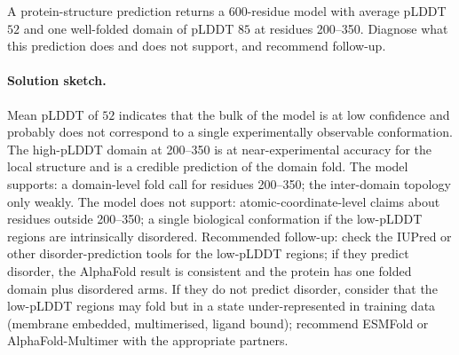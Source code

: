 \begin{exercise}
A protein-structure prediction returns a 600-residue model with
average pLDDT $52$ and one well-folded domain of pLDDT $85$ at
residues 200--350. Diagnose what this prediction does and does not
support, and recommend follow-up.

\paragraph{Solution sketch.}
Mean pLDDT of $52$ indicates that the bulk of the model is at low
confidence and probably does not correspond to a single experimentally
observable conformation. The high-pLDDT domain at 200--350 is at
near-experimental accuracy for the local structure and is a credible
prediction of the domain fold. The model supports: a domain-level
fold call for residues 200--350; the inter-domain topology only
weakly. The model does not support: atomic-coordinate-level claims
about residues outside 200--350; a single biological conformation if
the low-pLDDT regions are intrinsically disordered. Recommended
follow-up: check the IUPred or other disorder-prediction tools for
the low-pLDDT regions; if they predict disorder, the AlphaFold result
is consistent and the protein has one folded domain plus disordered
arms. If they do not predict disorder, consider that the low-pLDDT
regions may fold but in a state under-represented in training data
(membrane embedded, multimerised, ligand bound); recommend
ESMFold or AlphaFold-Multimer with the appropriate partners.
\end{exercise}

